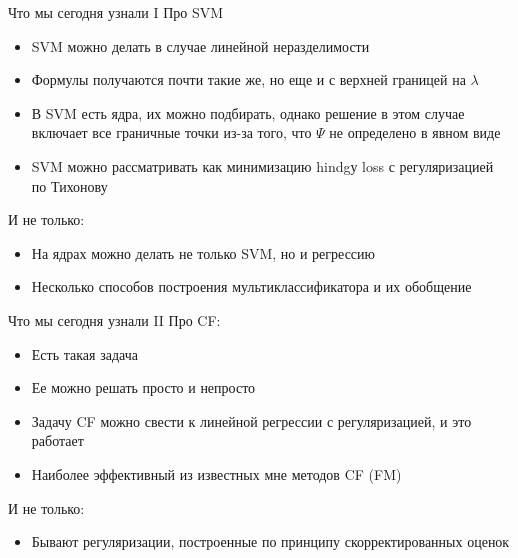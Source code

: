 \documentclass[14pt, fleqn, xcolor={dvipsnames, table}]{beamer}
\begin{document}
\begin{frame}{Что мы сегодня узнали I}
\small
Про SVM
\begin{itemize}
  \item SVM можно делать в случае линейной неразделимости
  \item Формулы получаются почти такие же, но еще и с верхней границей на $\lambda$
  \item В SVM есть ядра, их можно подбирать, однако решение в этом случае включает все граничные точки из-за того, что $\Psi$ не определено в явном виде
  \item SVM можно рассматривать как минимизацию hindgу loss с регуляризацией по Тихонову
\end{itemize}
И не только:
\begin{itemize}
  \item На ядрах можно делать не только SVM, но и регрессию
  \item Несколько способов построения мультиклассификатора и их обобщение
\end{itemize}
\end{frame}

\begin{frame}{Что мы сегодня узнали II}
\small
Про CF:
\begin{itemize}
  \item Есть такая задача
  \item Ее можно решать просто и непросто
  \item Задачу CF можно свести к линейной регрессии с регуляризацией, и это работает
  \item Наиболее эффективный из известных мне методов CF (FM)
\end{itemize}
И не только:
\begin{itemize}
  \item Бывают регуляризации, построенные по принципу скорректированных оценок
\end{itemize}
\end{frame}
\end{document}
